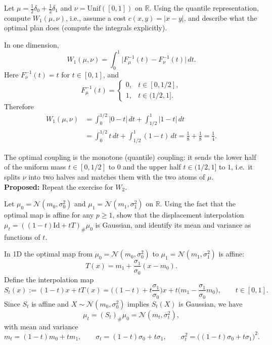 \begin{exercise}
Let \(\mu=\tfrac12\delta_{0}+\tfrac12\delta_{1}\) and \(\nu=\mathrm{Unif}([0,1])\) on \(\mathbb{R}\).
Using the quantile representation, compute \(W_1(\mu,\nu)\), i.e., assume a cost $c(x,y) = |x-y|$, and describe what the optimal plan does
(compute the integrals explicitly).
\end{exercise}

\begin{solution}
In one dimension,
\[
W_1(\mu,\nu)=\int_0^1 \big|F_\mu^{-1}(t)-F_\nu^{-1}(t)\big|\,dt.
\]
Here $F_\nu^{-1}(t)=t$ for $t\in[0,1]$, and
\[
F_\mu^{-1}(t)=
\begin{cases}
0, & t\in[0,1/2],\\
1, & t\in(1/2,1].
\end{cases}
\]
Therefore
\begin{align*}
W_1(\mu,\nu)
&=\int_0^{1/2} |0-t|\,dt+\int_{1/2}^{1} |1-t|\,dt \\
&=\int_0^{1/2} t\,dt+\int_{1/2}^{1} (1-t)\,dt
=\frac{1}{8}+\frac{1}{8}=\frac14.
\end{align*}

The optimal coupling is the monotone (quantile) coupling: it sends the lower half of the uniform mass
$t\in[0,1/2]$ to $0$ and the upper half $t\in(1/2,1]$ to $1$, i.e.\ it splits $\nu$ into two halves and
matches them with the two atoms of $\mu$.\\
\textbf{Proposed:} Repeat the exercise for $W_2$.
\end{solution}


\begin{exercise}
Let \(\mu_0=\mathcal N(m_0,\sigma_0^2)\) and \(\mu_1=\mathcal N(m_1,\sigma_1^2)\) on \(\mathbb{R}\).
Using the fact that the optimal map is affine for any $p\geq 1$, show that the displacement interpolation
\(\mu_t=((1-t)\mathrm{Id}+tT)_\#\mu_0\) is Gaussian, and identify its mean and variance as functions of \(t\).
\end{exercise}

\begin{solution}
In 1D the optimal map from $\mu_0=\mathcal N(m_0,\sigma_0^2)$ to $\mu_1=\mathcal N(m_1,\sigma_1^2)$ is affine:
\[
T(x)=m_1+\frac{\sigma_1}{\sigma_0}(x-m_0).
\]
Define the interpolation map
\[
S_t(x):=(1-t)x+tT(x)
= \Big((1-t)+t\frac{\sigma_1}{\sigma_0}\Big)x
+ t\Big(m_1-\frac{\sigma_1}{\sigma_0}m_0\Big),
\qquad t\in[0,1].
\]
Since $S_t$ is affine and $X\sim\mathcal N(m_0,\sigma_0^2)$ implies $S_t(X)$ is Gaussian, we have
\[
\mu_t=(S_t)_\#\mu_0=\mathcal N(m_t,\sigma_t^2),
\]
with mean and variance
\[
m_t = (1-t)m_0+t m_1,
\qquad
\sigma_t = (1-t)\sigma_0+t\sigma_1,
\qquad
\sigma_t^2 = \big((1-t)\sigma_0+t\sigma_1\big)^2.
\]
\end{solution}



